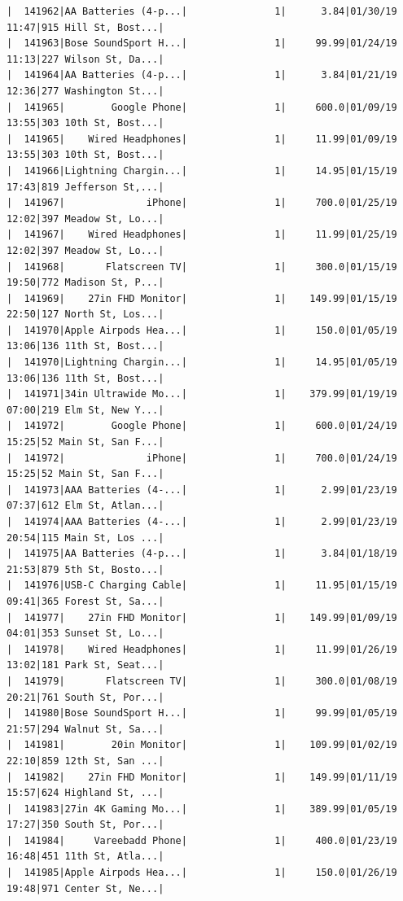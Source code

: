 \documentclass[
  letterpaper,
  DIV=11,
  numbers=noendperiod]{scrartcl}
\begin{document}
\begin{verbatim}
|  141962|AA Batteries (4-p...|               1|      3.84|01/30/19 11:47|915 Hill St, Bost...|
|  141963|Bose SoundSport H...|               1|     99.99|01/24/19 11:13|227 Wilson St, Da...|
|  141964|AA Batteries (4-p...|               1|      3.84|01/21/19 12:36|277 Washington St...|
|  141965|        Google Phone|               1|     600.0|01/09/19 13:55|303 10th St, Bost...|
|  141965|    Wired Headphones|               1|     11.99|01/09/19 13:55|303 10th St, Bost...|
|  141966|Lightning Chargin...|               1|     14.95|01/15/19 17:43|819 Jefferson St,...|
|  141967|              iPhone|               1|     700.0|01/25/19 12:02|397 Meadow St, Lo...|
|  141967|    Wired Headphones|               1|     11.99|01/25/19 12:02|397 Meadow St, Lo...|
|  141968|       Flatscreen TV|               1|     300.0|01/15/19 19:50|772 Madison St, P...|
|  141969|    27in FHD Monitor|               1|    149.99|01/15/19 22:50|127 North St, Los...|
|  141970|Apple Airpods Hea...|               1|     150.0|01/05/19 13:06|136 11th St, Bost...|
|  141970|Lightning Chargin...|               1|     14.95|01/05/19 13:06|136 11th St, Bost...|
|  141971|34in Ultrawide Mo...|               1|    379.99|01/19/19 07:00|219 Elm St, New Y...|
|  141972|        Google Phone|               1|     600.0|01/24/19 15:25|52 Main St, San F...|
|  141972|              iPhone|               1|     700.0|01/24/19 15:25|52 Main St, San F...|
|  141973|AAA Batteries (4-...|               1|      2.99|01/23/19 07:37|612 Elm St, Atlan...|
|  141974|AAA Batteries (4-...|               1|      2.99|01/23/19 20:54|115 Main St, Los ...|
|  141975|AA Batteries (4-p...|               1|      3.84|01/18/19 21:53|879 5th St, Bosto...|
|  141976|USB-C Charging Cable|               1|     11.95|01/15/19 09:41|365 Forest St, Sa...|
|  141977|    27in FHD Monitor|               1|    149.99|01/09/19 04:01|353 Sunset St, Lo...|
|  141978|    Wired Headphones|               1|     11.99|01/26/19 13:02|181 Park St, Seat...|
|  141979|       Flatscreen TV|               1|     300.0|01/08/19 20:21|761 South St, Por...|
|  141980|Bose SoundSport H...|               1|     99.99|01/05/19 21:57|294 Walnut St, Sa...|
|  141981|        20in Monitor|               1|    109.99|01/02/19 22:10|859 12th St, San ...|
|  141982|    27in FHD Monitor|               1|    149.99|01/11/19 15:57|624 Highland St, ...|
|  141983|27in 4K Gaming Mo...|               1|    389.99|01/05/19 17:27|350 South St, Por...|
|  141984|     Vareebadd Phone|               1|     400.0|01/23/19 16:48|451 11th St, Atla...|
|  141985|Apple Airpods Hea...|               1|     150.0|01/26/19 19:48|971 Center St, Ne...|

\end{verbatim}
\end{document}
